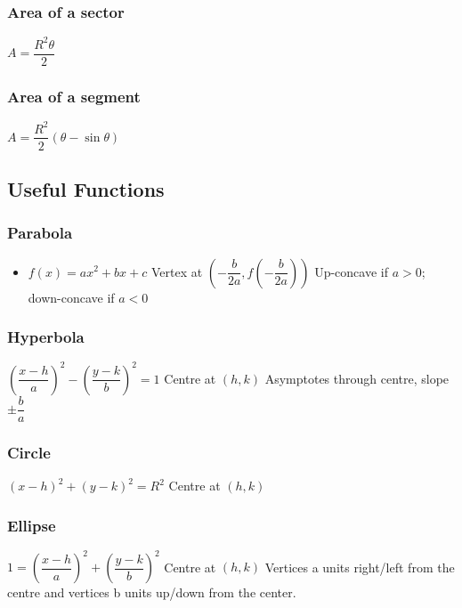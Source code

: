 \subsubsection{Area of a sector}
\begin{itemize}
\itemt \( A = \dfrac{R^2\theta}{2} \)
\end{itemize}

\subsubsection{Area of a segment}
\begin{itemize}
\itemt \( A = \dfrac{R^2}{2} (\theta - \sin\theta) \)
\end{itemize}

		
        \subsection{Useful Functions}
        
\subsubsection{Parabola}
\begin{itemize}
\itemt \( f(x) = a(x-h)^2 + k \)
\itemt Vertex at \( (h,k) \)
\itemt Up-concave if $a>0$; down-concave if $a<0$
\item[]
\itemt \( f(x) = ax^2 + bx + c \)
\itemt Vertex at \( \left(-\dfrac{b}{2a}, f\left(-\dfrac{b}{2a}\right)\right) \)
\itemt Up-concave if $a>0$; down-concave if $a<0$
\end{itemize}

\subsubsection{Hyperbola}
\begin{itemize}
\itemt \( \left(\dfrac{x-h}{a}\right)^2 - \left(\dfrac{y-k}{b}\right)^2 = 1\)
\itemt Centre at $(h,k)$
\itemt Asymptotes through centre, slope $\pm\dfrac{b}{a}$
\end{itemize}

\subsubsection{Circle}
\begin{itemize}
\itemt \( (x-h)^2 + (y-k)^2 = R^2\)
\itemt Centre at $(h,k)$
\end{itemize}

\subsubsection{Ellipse}
\begin{itemize}
\itemt \(1 = \left(\dfrac{x-h}{a}\right)^2 + \left(\dfrac{y-k}{b}\right)^2\)
\itemt Centre at $(h,k)$
\itemt Vertices a units right/left from the centre and vertices b units up/down from the center.
\end{itemize}	

